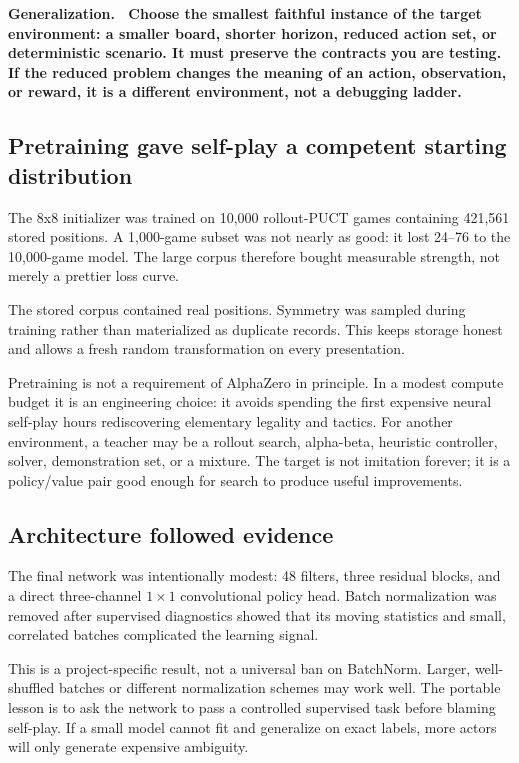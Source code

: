\documentclass[10.5pt,letterpaper]{article}
\newcommand{\boxtitle}[1]{\sffamily\bfseries\color{deepblue}#1.\ }
\begin{document}
\begin{plainbox}
\boxtitle{Generalization}
Choose the smallest faithful instance of the target environment: a smaller
board, shorter horizon, reduced action set, or deterministic scenario. It must
preserve the contracts you are testing. If the reduced problem changes the
meaning of an action, observation, or reward, it is a different environment,
not a debugging ladder.
\end{plainbox}

\subsection{Pretraining gave self-play a competent starting distribution}

The 8x8 initializer was trained on 10,000 rollout-PUCT games containing 421,561
stored positions. A 1,000-game subset was not nearly as good: it lost 24--76 to
the 10,000-game model. The large corpus therefore bought measurable strength,
not merely a prettier loss curve.

The stored corpus contained real positions. Symmetry was sampled during
training rather than materialized as duplicate records. This keeps storage
honest and allows a fresh random transformation on every presentation.

Pretraining is not a requirement of AlphaZero in principle. In a modest compute
budget it is an engineering choice: it avoids spending the first expensive
neural self-play hours rediscovering elementary legality and tactics. For
another environment, a teacher may be a rollout search, alpha-beta, heuristic
controller, solver, demonstration set, or a mixture. The target is not
imitation forever; it is a policy/value pair good enough for search to produce
useful improvements.

\subsection{Architecture followed evidence}

The final network was intentionally modest: 48 filters, three residual blocks,
and a direct three-channel $1\times1$ convolutional policy head. Batch
normalization was removed after supervised diagnostics showed that its moving
statistics and small, correlated batches complicated the learning signal.

This is a project-specific result, not a universal ban on BatchNorm. Larger,
well-shuffled batches or different normalization schemes may work well. The
portable lesson is to ask the network to pass a controlled supervised task
before blaming self-play. If a small model cannot fit and generalize on exact
labels, more actors will only generate expensive ambiguity.
\end{document}

